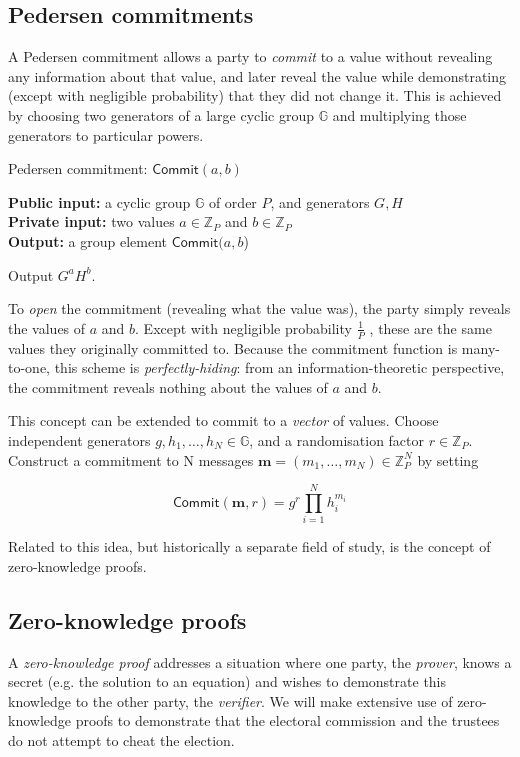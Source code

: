 \documentclass[12pt,a4paper]{article}
\theoremstyle{definition}
\begin{document}
\subsection{Pedersen commitments}
A Pedersen commitment allows a party to \textit{commit} to a value without revealing any information about that value, and later reveal the value while demonstrating (except with negligible probability) that they did not change it. This is achieved by choosing two generators of a large cyclic group $\mathbb{G}$ and multiplying those generators to particular powers.

\begin{algorithm}\caption{Pedersen commitment: $\mathsf{Commit}(a, b)$}\label{prot:Pedersen}
    \textbf{Public input:} a cyclic group $\mathbb{G}$ of order $P$, and generators $G, H$\\
    \textbf{Private input:} two values $a\in\mathbb{Z}_P$ and $b\in\mathbb{Z}_P$\\
    \textbf{Output:} a group element $\mathsf{Commit}(a, b$)
    \begin{algorithmic}[1]
        \State Output $G^a H^b$.
    \end{algorithmic}
\end{algorithm}
To \textit{open} the commitment (revealing what the value was), the party simply reveals the values of $a$ and $b$. Except with negligible probability $\frac{1}{P}$%
, these are the same values they originally committed to. Because the commitment function is many-to-one, this scheme is \textit{perfectly-hiding}: from an information-theoretic perspective, the commitment reveals nothing about the values of $a$ and $b$.

This concept can be extended to commit to a \textit{vector} of values. Choose independent generators $g, h_1, \ldots, h_N\in\mathbb{G}$, and a randomisation factor $r\in\mathbb{Z}_P$. Construct a commitment to N messages $\mathbf{m}=(m_1,\ldots,m_N)\in\mathbb{Z}_P^N$ by setting

$$\mathsf{Commit}(\mathbf{m}, r)=g^r\prod_{i=1}^N h_i^{m_i}$$

Related to this idea, but historically a separate field of study, is the concept of zero-knowledge proofs.

\subsection{Zero-knowledge proofs}
A \textit{zero-knowledge proof} addresses a situation where one party, the \textit{prover}, knows a secret (e.g. the solution to an equation) and wishes to demonstrate this knowledge to the other party, the \textit{verifier}. We will make extensive use of zero-knowledge proofs to demonstrate that the electoral commission and the trustees do not attempt to cheat the election.
\end{document}
